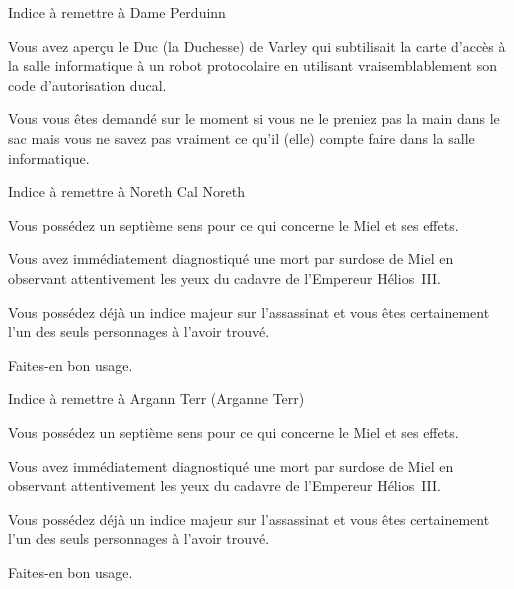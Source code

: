 \documentclass{article}
\begin{document}
\begin{samepage}
    Indice à remettre à Dame Perduinn

    \nobreak

    \begin{framed}
        Vous avez aperçu le Duc (la Duchesse) de Varley qui subtilisait la
        carte d'accès à la salle informatique à un robot protocolaire en
        utilisant vraisemblablement son code d'autorisation ducal.

        \nobreak

        Vous vous êtes demandé sur le moment si vous ne le preniez pas la main
        dans le sac mais vous ne savez pas vraiment ce qu'il (elle) compte
        faire dans la salle informatique.
    \end{framed}
\end{samepage}

\begin{samepage}
    Indice à remettre à Noreth Cal Noreth

    \nobreak

    \begin{framed}
        Vous possédez un septième sens pour ce qui concerne le Miel et ses
        effets.

        \nobreak

        Vous avez immédiatement diagnostiqué une mort par surdose de Miel en
        observant attentivement les yeux du cadavre de l'Empereur Hélios~III.

        \nobreak

        Vous possédez déjà un indice majeur sur l'assassinat et vous êtes
        certainement l'un des seuls personnages à l'avoir trouvé.

        \nobreak

        Faites-en bon usage.
    \end{framed}
\end{samepage}

\begin{samepage}
    Indice à remettre à Argann Terr (Arganne Terr)

    \nobreak

    \begin{framed}
        Vous possédez un septième sens pour ce qui concerne le Miel et ses
        effets.

        \nobreak

        Vous avez immédiatement diagnostiqué une mort par surdose de Miel en
        observant attentivement les yeux du cadavre de l'Empereur Hélios~III.

        \nobreak

        Vous possédez déjà un indice majeur sur l'assassinat et vous êtes
        certainement l'un des seuls personnages à l'avoir trouvé.

        \nobreak

        Faites-en bon usage.
    \end{framed}
\end{samepage}
\end{document}
